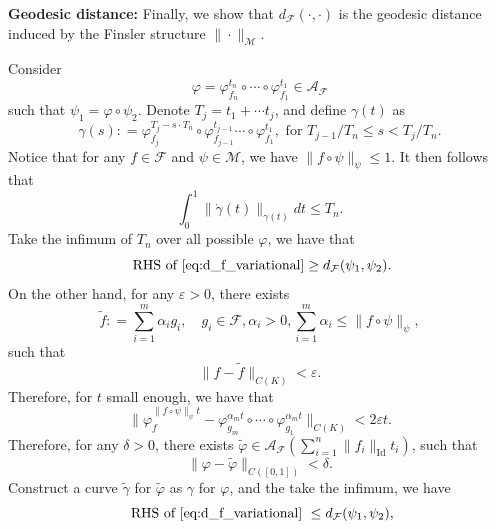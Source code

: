 \documentclass[12pt]{amsart}
\numberwithin{equation}{section}
\theoremstyle{remark}
\begin{document}
\textbf{Geodesic distance:} Finally, we show that $d_{\mathcal F}(\cdot, \cdot)$ is the geodesic distance induced by the Finsler structure $\|\cdot\|_{\mathcal M}$.

Consider
\begin{equation}
    \varphi = \varphi_{f_n}^{t_n}\circ \cdots \circ \varphi_{f_1}^{t_1}\in \mathcal A_{\mathcal F}
\end{equation}
such that $\psi_1=\varphi\circ \psi_2$. Denote $T_j=t_1+\cdots t_j$, and define $\gamma(t)$ as
\begin{equation}
    \gamma(s): = \varphi_{f_j}^{T_j-s\cdot T_n}\circ \varphi_{f_{j-1}}^{t_{j-1}} \cdots \circ \varphi_{f_1}^{t_1}, \text{ for } T_{j-1}/T_n\le s < T_{j}/T_n.
\end{equation}
Notice that for any $f\in \mathcal F$ and $\psi\in \mathcal M$, we have $\|f\circ \psi\|_{\mathcal \psi}\le 1$. It then follows that
\begin{equation}
    \int_0^1 \|\dot \gamma(t)\|_{\gamma(t)} dt\le T_n.
\end{equation}
Take the infimum of $T_n$ over all possible $\varphi$, we have that
\begin{equation}
    \text{ RHS of~\eqref{eq:d_f_variational}}\ge d_{\mathcal F} (\psi_1, \psi_2).
\end{equation}
On the other hand, for any $\varepsilon>0$, there exists
\begin{equation}
    \tilde f: =\sum_{i=1}^m \alpha_i g_i, \quad g_i\in \mathcal F, \alpha_i>0, \sum_{i=1}^m\alpha_i\le \|f\circ \psi\|_{\psi},
\end{equation}
such that
\begin{equation}
    \|f-\tilde f\|_{C(K)}< \varepsilon.
\end{equation}
Therefore, for $t$ small enough, we have that
\begin{equation}
    \|\varphi_f^{\|f\circ\psi\|_{\psi}t}-\varphi_{g_m}^{\alpha_mt}\circ \cdots \circ \varphi_{g_1}^{\alpha_m t}\|_{C(K)}< 2\varepsilon t.
\end{equation}
Therefore, for any $\delta >0$, there exists $\tilde\varphi\in \mathcal A_{\mathcal F}(\sum_{i=1}^n \|f_i\|_{\operatorname{Id}}t_i)$, such that
\begin{equation}
    \|\varphi-\tilde \varphi\|_{C([0,1])}< \delta.
\end{equation}
Construct a curve $\tilde \gamma$ for $\tilde \varphi$ as $\gamma$ for $\varphi$, and the take the infimum, we have
\begin{equation}
    \text{ RHS of~\eqref{eq:d_f_variational} }\le d_{\mathcal F} (\psi_1, \psi_2),
\end{equation}
\fi
\end{document}
